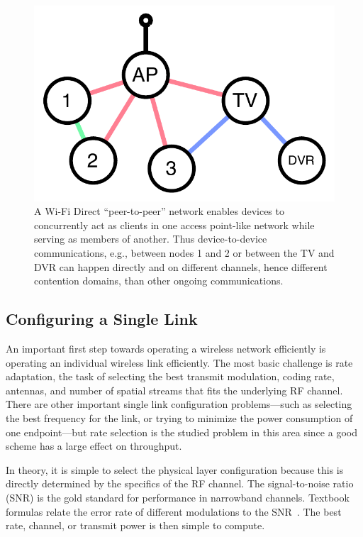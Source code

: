 \begin{figure}[p]
      \centering
      \includegraphics[width=0.8\columnwidth]{figures/omni/p2p.pdf}
      \caption{\label{fig:wifi_p2p} A Wi-Fi Direct ``peer-to-peer'' network enables devices to concurrently act as clients in one access point-like network while serving as members of another. Thus device-to-device communications, e.g., between nodes 1 and 2 or between the TV and DVR can happen directly and on different channels, hence different contention domains, than other ongoing communications.}
\end{figure}

\subsection{Configuring a Single Link}
An important first step towards operating a wireless network efficiently is operating an individual wireless link efficiently. The most basic challenge is rate adaptation, the task of selecting the best transmit modulation, coding rate, antennas, and number of spatial streams that fits the underlying RF channel. There are other important single link configuration problems---such as selecting the best frequency for the link, or trying to minimize the power consumption of one endpoint---but rate selection is the studied problem in this area since a good scheme has a large effect on throughput.

In theory, it is simple to select the physical layer configuration because this is directly determined by the specifics of the RF channel. The signal-to-noise ratio (SNR) is the gold standard for performance in narrowband channels. Textbook formulas relate the error rate of different modulations to the SNR~\cite{Tse}. The best rate, channel, or transmit power is then simple to compute.

